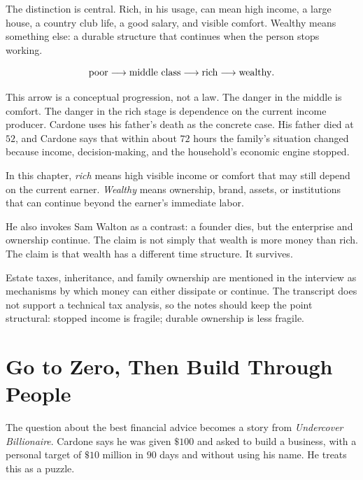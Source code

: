 The distinction is central. Rich, in his usage, can mean high income, a large house, a country club life, a good salary, and visible comfort. Wealthy means something else: a durable structure that continues when the person stops working.

\begin{equation}
\hbox{poor}\longrightarrow \hbox{middle class}\longrightarrow \hbox{rich}\longrightarrow \hbox{wealthy}.
\end{equation}

This arrow is a conceptual progression, not a law. The danger in the middle is comfort. The danger in the rich stage is dependence on the current income producer. Cardone uses his father's death as the concrete case. His father died at \(52\), and Cardone says that within about \(72\) hours the family's situation changed because income, decision-making, and the household's economic engine stopped.

\begin{definition}
In this chapter, \emph{rich} means high visible income or comfort that may still depend on the current earner. \emph{Wealthy} means ownership, brand, assets, or institutions that can continue beyond the earner's immediate labor.
\end{definition}

He also invokes Sam Walton as a contrast: a founder dies, but the enterprise and ownership continue. The claim is not simply that wealth is more money than rich. The claim is that wealth has a different time structure. It survives.

\begin{remark}
Estate taxes, inheritance, and family ownership are mentioned in the interview as mechanisms by which money can either dissipate or continue. The transcript does not support a technical tax analysis, so the notes should keep the point structural: stopped income is fragile; durable ownership is less fragile.
\end{remark}

\section{Go to Zero, Then Build Through People}

The question about the best financial advice becomes a story from \emph{Undercover Billionaire}. Cardone says he was given \(\$100\) and asked to build a business, with a personal target of \(\$10\) million in \(90\) days and without using his name. He treats this as a puzzle.

